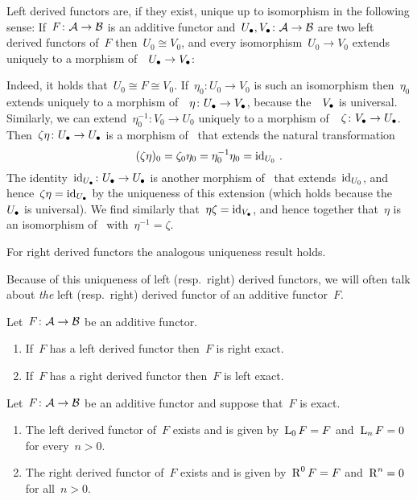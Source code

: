 \begin{remark}
  Left derived functors are, if they exist, unique up to isomorphism in the following sense:
  If~$F \colon \mathcal{A} \to \mathcal{B}$ is an additive functor and~$U_\bullet, V_\bullet \colon \mathcal{A} \to \mathcal{B}$ are two left derived functors of~$F$ then~$U_0 \cong V_0$, and every isomorphism~$U_0 \to V_0$ extends uniquely to a morphism of~{\deltafuns}~$U_\bullet \to V_\bullet$:
  
  Indeed, it holds that~$U_0 \cong F \cong V_0$.
  If~$\eta_0 \colon U_0 \to V_0$ is such an isomorphism then~$\eta_0$ extends uniquely to a morphism of~{\deltafuns}~$\eta \colon U_\bullet \to V_\bullet$, because the~{\deltafun}~$V_\bullet$ is universal.
  Similarly, we can extend~$\eta_0^{-1} \colon V_0 \to U_0$ uniquely to a morphism of~{\deltafuns}~$\zeta \colon V_\bullet \to U_\bullet$.
  Then~$\zeta \eta \colon U_\bullet \to U_\bullet$ is a morphism of~{\deltafuns} that extends the natural transformation
  \[
      (\zeta \eta)_0
    = \zeta_0 \eta_0
    = \eta_0^{-1} \eta_0
    = \operatorname{id}_{U_0} \,.
  \]
  The identity~$\operatorname{id}_{U_\bullet} \colon U_\bullet \to U_\bullet$ is another morphism of~{\deltafuns} that extends~$\operatorname{id}_{U_0}$, and hence~$\zeta \eta = \operatorname{id}_{U_\bullet}$ by the uniqueness of this extension (which holds because the~{\deltafun}~$U_\bullet$ is universal).
  We find similarly that~$\eta \zeta = \operatorname{id}_{V_\bullet}$, and hence together that~$\eta$ is an isomorphism of~{\deltafuns} with~$\eta^{-1} = \zeta$.
  
  For right derived functors the analogous uniqueness result holds.
\end{remark}


\begin{notation*}
  Because of this uniqueness of left (resp.\ right) derived functors, we will often talk about \emph{the} left (resp.\ right) derived functor of an additive functor~$F$.
\end{notation*}


\begin{remark}
  Let~$F \colon \mathcal{A} \to \mathcal{B}$ be an additive functor.
  \begin{enumerate}
    \item
      If~$F$ has a left derived functor then~$F$ is right exact.
    \item
      If~$F$ has a right derived functor then~$F$ is left exact.
  \end{enumerate}
\end{remark}


\begin{lemma}
  Let~$F \colon \mathcal{A} \to \mathcal{B}$ be an additive functor and suppose that~$F$ is exact.
  \begin{enumerate}
    \item
      \label{left derived for exact}
      The left derived functor of~$F$ exists and is given by~$\operatorname{L}_0 F = F$ and~$\operatorname{L}_n F = 0$ for every~$n > 0$.
    \item
      \label{right derived for exact}
      The right derived functor of~$F$ exists and is given by~$\operatorname{R}^0 F = F$ and~$\operatorname{R}^n = 0$ for all~$n > 0$.
  \end{enumerate}
\end{lemma}


